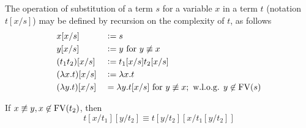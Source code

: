 \documentclass[11pt]{article}
\begin{document}
\begin{definition}[Substitution]
The operation of substitution of a term \(s\) for a variable \(x\) in a term \(t\)
(notation \(t[x/s]\)) may be defined by recursion on the complexity of \(t\), as
follows
\begin{alignat*}{2}
&x[x/s]&&:=s\\
&y[x/s]&&:=y\text{ for } y\not\equiv x\\
&(t_1t_2)[x/s]&&:=t_1[x/s]t_2[x/s]\\
&(\lambda x.t)[x/s]&&:=\lambda x.t\\
&(\lambda y.t)[x/s]&&=\lambda y.t[x/s]\text{ for } y\not\equiv x; \text{
w.l.o.g. } y\not\in\text{FV}(s)
\end{alignat*}
\end{definition}

\begin{lemma}
If \(x\not\equiv y, x\not\in\text{FV}(t_2)\), then
\begin{equation*}
t[x/t_1][y/t_2]\equiv t[y/t_2][x/t_1[y/t_2]]
\end{equation*}
\end{lemma}
\end{document}
